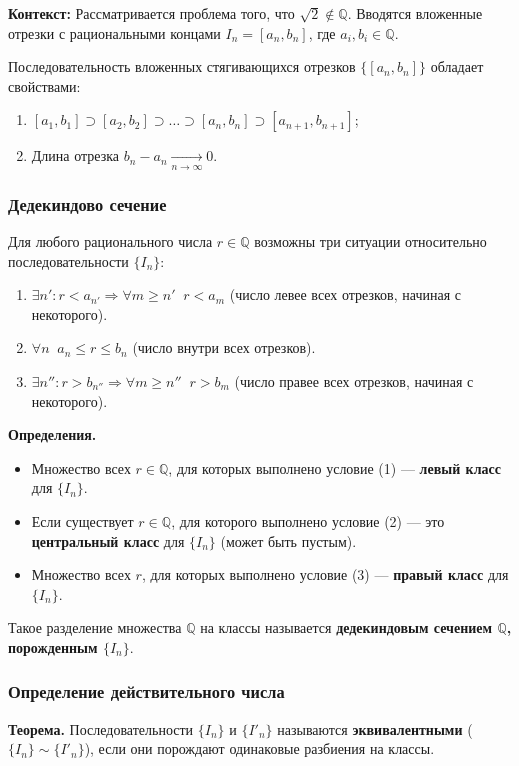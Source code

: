 \textbf{Контекст:} Рассматривается проблема того, что $\sqrt{2} \notin \mathbb{Q}$. Вводятся вложенные отрезки с рациональными концами $I_n = [a_n, b_n]$, где $a_i, b_i \in \mathbb{Q}$.

Последовательность вложенных стягивающихся отрезков $\{[a_n, b_n]\}$ обладает свойствами:
\begin{enumerate}
    \item $[a_1, b_1] \supset [a_2, b_2] \supset \dots \supset [a_n, b_n] \supset [a_{n+1}, b_{n+1}]$;
    \item Длина отрезка $b_n - a_n \xrightarrow[n\to\infty]{} 0$.
\end{enumerate}

\subsubsection*{Дедекиндово сечение}
Для любого рационального числа $r \in \mathbb{Q}$ возможны три ситуации относительно последовательности $\{I_n\}$:
\begin{enumerate}
    \item $\exists n': r < a_{n'} \Rightarrow \forall m \ge n' \;\; r < a_m$ (число левее всех отрезков, начиная с некоторого).
    \item $\forall n \;\; a_n \le r \le b_n$ (число внутри всех отрезков).
    \item $\exists n'': r > b_{n''} \Rightarrow \forall m \ge n'' \;\; r > b_m$ (число правее всех отрезков, начиная с некоторого).
\end{enumerate}

\textbf{Определения. }
    \begin{itemize}
        \item Множество всех $r \in \mathbb{Q}$, для которых выполнено условие (1) — \textbf{левый класс} для $\{I_n\}$.
        \item Если существует $r \in \mathbb{Q}$, для которого выполнено условие (2) — это \textbf{центральный класс} для $\{I_n\}$ (может быть пустым).
        \item Множество всех $r$, для которых выполнено условие (3) — \textbf{правый класс} для $\{I_n\}$.
    \end{itemize}
    Такое разделение множества $\mathbb{Q}$ на классы называется \textbf{дедекиндовым сечением $\mathbb{Q}$, порожденным $\{I_n\}$}.

\subsubsection*{Определение действительного числа}
\textbf{Теорема. }
    Последовательности $\{I_n\}$ и $\{I'_n\}$ называются \textbf{эквивалентными} ($\{I_n\} \sim \{I'_n\}$), если они порождают одинаковые разбиения на классы.

